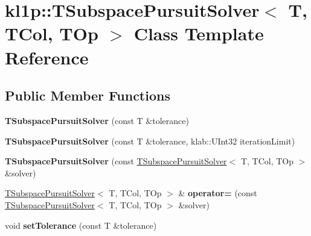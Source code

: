 \hypertarget{classkl1p_1_1TSubspacePursuitSolver}{}\section{kl1p\+:\+:T\+Subspace\+Pursuit\+Solver$<$ T, T\+Col, T\+Op $>$ Class Template Reference}
\label{classkl1p_1_1TSubspacePursuitSolver}
\subsection*{Public Member Functions}
\begin{DoxyCompactItemize}
\item 
{\bfseries T\+Subspace\+Pursuit\+Solver} (const T \&tolerance)\hypertarget{classkl1p_1_1TSubspacePursuitSolver_a21085ff591601850350ca7bf5be0bfcb}{}\label{classkl1p_1_1TSubspacePursuitSolver_a21085ff591601850350ca7bf5be0bfcb}

\item 
{\bfseries T\+Subspace\+Pursuit\+Solver} (const T \&tolerance, klab\+::\+U\+Int32 iteration\+Limit)\hypertarget{classkl1p_1_1TSubspacePursuitSolver_a3cce377ee31316476b416b93dd38c6c8}{}\label{classkl1p_1_1TSubspacePursuitSolver_a3cce377ee31316476b416b93dd38c6c8}

\item 
{\bfseries T\+Subspace\+Pursuit\+Solver} (const \hyperlink{classkl1p_1_1TSubspacePursuitSolver}{T\+Subspace\+Pursuit\+Solver}$<$ T, T\+Col, T\+Op $>$ \&solver)\hypertarget{classkl1p_1_1TSubspacePursuitSolver_a636b15a838af69070d9181ba175d854c}{}\label{classkl1p_1_1TSubspacePursuitSolver_a636b15a838af69070d9181ba175d854c}

\item 
\hyperlink{classkl1p_1_1TSubspacePursuitSolver}{T\+Subspace\+Pursuit\+Solver}$<$ T, T\+Col, T\+Op $>$ \& {\bfseries operator=} (const \hyperlink{classkl1p_1_1TSubspacePursuitSolver}{T\+Subspace\+Pursuit\+Solver}$<$ T, T\+Col, T\+Op $>$ \&solver)\hypertarget{classkl1p_1_1TSubspacePursuitSolver_a42e218c2bdc1c2b84de7f217bb427375}{}\label{classkl1p_1_1TSubspacePursuitSolver_a42e218c2bdc1c2b84de7f217bb427375}

\item 
void {\bfseries set\+Tolerance} (const T \&tolerance)\hypertarget{classkl1p_1_1TSubspacePursuitSolver_aade8dcf6c9111592316272d5b374f5c0}{}\label{classkl1p_1_1TSubspacePursuitSolver_aade8dcf6c9111592316272d5b374f5c0}


\end{DoxyCompactItemize}
